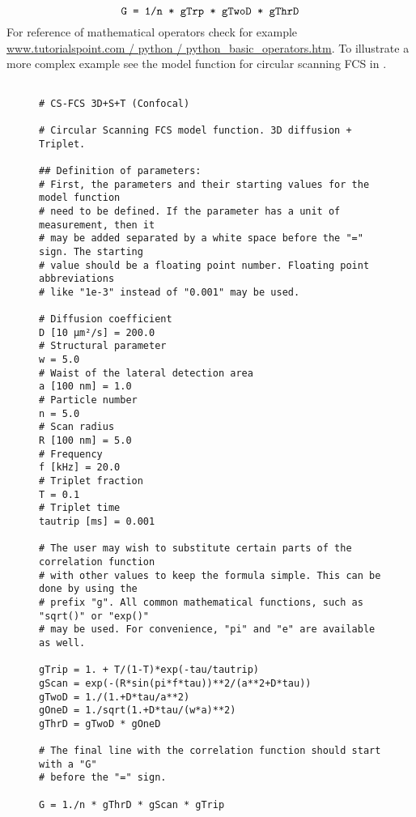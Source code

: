 \begin{equation}
\texttt{G = 1/n * gTrp * gTwoD * gThrD} \notag
\end{equation}
For reference of mathematical operators check for example \href{http://www.tutorialspoint.com/python/python_basic_operators.htm}{www.tutorialspoint.com / python / python\_basic\_operators.htm}. To illustrate a more complex example see the model function for circular scanning FCS in . 


\begin{figure}
\begin{Verbatim}[frame = single]

# CS-FCS 3D+S+T (Confocal)

# Circular Scanning FCS model function. 3D diffusion + Triplet.

## Definition of parameters:
# First, the parameters and their starting values for the model function
# need to be defined. If the parameter has a unit of measurement, then it 
# may be added separated by a white space before the "=" sign. The starting
# value should be a floating point number. Floating point abbreviations 
# like "1e-3" instead of "0.001" may be used.

# Diffusion coefficient
D [10 µm²/s] = 200.0
# Structural parameter
w = 5.0
# Waist of the lateral detection area
a [100 nm] = 1.0
# Particle number
n = 5.0
# Scan radius
R [100 nm] = 5.0
# Frequency
f [kHz] = 20.0
# Triplet fraction
T = 0.1
# Triplet time
tautrip [ms] = 0.001

# The user may wish to substitute certain parts of the correlation function
# with other values to keep the formula simple. This can be done by using the
# prefix "g". All common mathematical functions, such as "sqrt()" or "exp()"
# may be used. For convenience, "pi" and "e" are available as well.

gTrip = 1. + T/(1-T)*exp(-tau/tautrip)
gScan = exp(-(R*sin(pi*f*tau))**2/(a**2+D*tau))
gTwoD = 1./(1.+D*tau/a**2)
gOneD = 1./sqrt(1.+D*tau/(w*a)**2)
gThrD = gTwoD * gOneD

# The final line with the correlation function should start with a "G"
# before the "=" sign.

G = 1./n * gThrD * gScan * gTrip

\end{Verbatim}
\end{figure}



